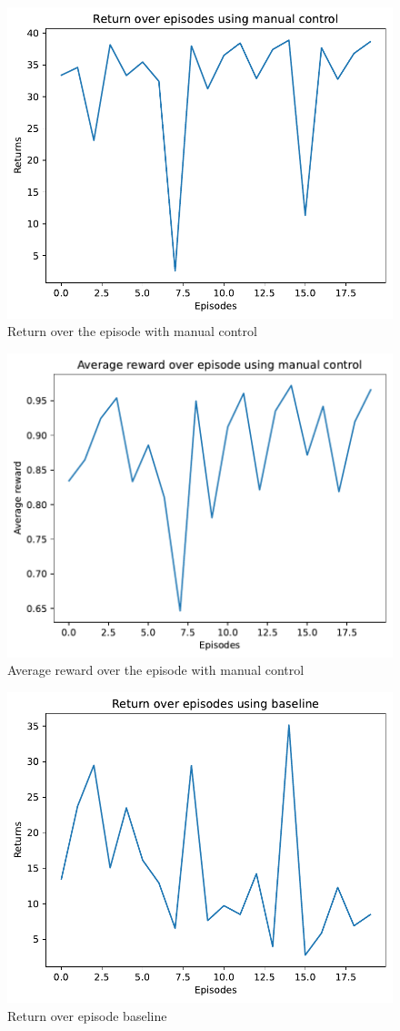 \documentclass{article}
\begin{document}
\begin{figure}
    \centering
    \includegraphics[width=0.7\linewidth]{img/Return_over_episode_manual.pdf}
    \caption{Return over the episode with manual control}
    \label{fig:Return_episode_manual}
\end{figure}

\begin{figure}
    \centering
    \includegraphics[width=0.7\linewidth]{img/Average_reward_over_episode_manual.pdf}
    \caption{Average reward over the episode with manual control}
    \label{fig:Reward_episode_manual}
\end{figure}

\begin{figure}
    \centering
    \includegraphics[width=0.7\linewidth]{img/Return_over_episode_baseline.pdf}
    \caption{Return over episode baseline}
    \label{fig:Return_episode_baseline}
\end{figure}
\end{document}

